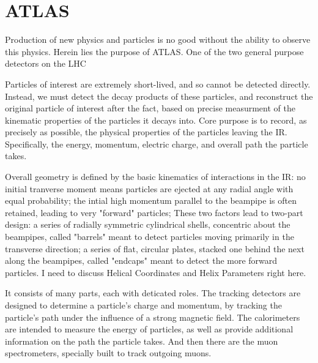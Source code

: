 
\chapter{ATLAS} %
    Production of new physics and particles is no good without the ability to observe this physics. Herein lies the purpose of ATLAS. 
    One of the two general purpose detectors on the LHC


    Particles of interest are extremely short-lived, and so cannot be detected directly.
    Instead, we must detect the decay products of these particles, and reconstruct the original particle of interest after the fact, based on precise measurment of the kinematic properties of the particles it decays into.
    Core purpose is to record, as precisely as possible, the physical properties of the particles leaving the IR. Specifically, the energy, momentum, electric charge, and overall path the particle takes.



    Overall geometry is defined by the basic kinematics of interactions in the IR:
        no initial tranverse moment means particles are ejected at any radial angle with equal probability;
        the intial high momentum parallel to the beampipe is often retained, leading to very "forward" particles;
        These two factors lead to two-part design:
            a series of radially symmetric cylindrical shells, concentric about the beampipes, called "barrels" meant to detect particles moving primarily in the transverse direction;
            a series of flat, circular plates, stacked one behind the next along the beampipes, called "endcaps" meant to detect the more forward particles.
    I need to discuss Helical Coordinates and Helix Parameters right here. %



    It consists of many parts, each with deticated roles.
    The tracking detectors are designed to determine a particle's charge and momentum, by tracking the particle's path under the influence of a strong magnetic field.
    The calorimeters are intended to measure the energy of particles, as well as provide additional information on the path the particle takes.
    And then there are the muon spectrometers, specially built to track outgoing muons.

